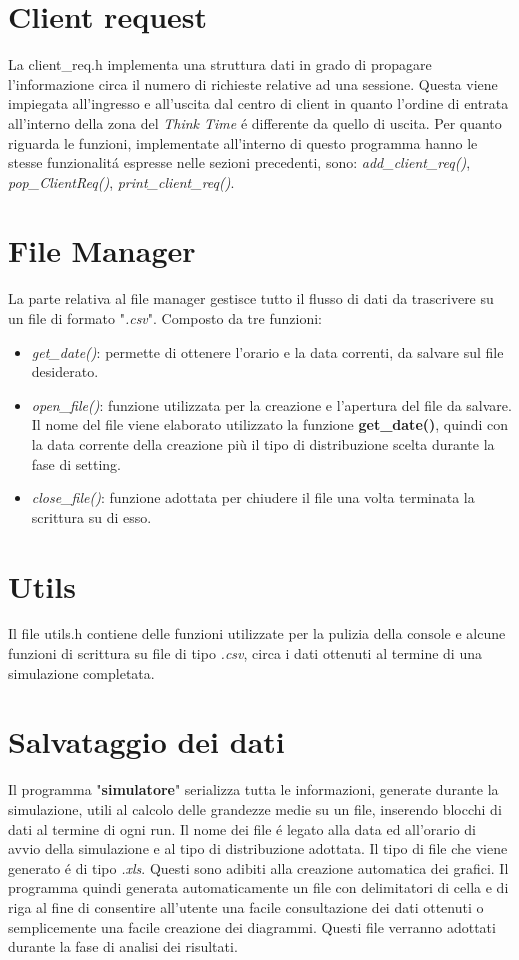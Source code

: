 \section{Client request}
La client\_req.h implementa una struttura dati in grado di propagare l'informazione circa il numero di richieste relative ad una sessione. Questa viene impiegata all'ingresso e all'uscita dal centro di client in quanto l'ordine di entrata all'interno della zona del \textit{Think Time} \'e differente da quello di uscita.
Per quanto riguarda le funzioni, implementate all'interno di questo programma hanno le stesse funzionalit\'a espresse nelle sezioni precedenti, sono: \textit{add\_client\_req()}, \textit{pop\_ClientReq()}, \textit{print\_client\_req()}.

\section{File Manager}
La parte relativa al file manager gestisce tutto il flusso di dati da trascrivere  su un file di formato "\textit{.csv}". Composto da tre funzioni:
\begin{itemize}
\item \textit{get\_date()}: permette di ottenere l'orario e la data correnti, da salvare sul file desiderato.
\item \textit{open\_file()}: funzione utilizzata per la creazione e l'apertura del file da salvare. Il nome del file viene elaborato utilizzato la funzione \textbf{get\_date()}, quindi con la data corrente della creazione più il tipo di distribuzione scelta durante la fase di setting.
\item \textit{close\_file()}: funzione adottata per chiudere il file una volta terminata la scrittura su di esso.
\end{itemize}

\section{Utils}
Il file utils.h contiene delle funzioni utilizzate per la pulizia della console e alcune funzioni di scrittura su file di tipo \textit{.csv}, circa i dati ottenuti al termine di una simulazione completata.

\section{Salvataggio dei dati}
Il programma "\textbf{simulatore}" serializza tutta le informazioni, generate durante la simulazione, utili al calcolo delle grandezze medie su un file, inserendo blocchi di dati al termine di ogni run.
Il nome dei file \'e legato alla data ed all'orario di avvio della simulazione e al tipo di distribuzione adottata.
Il tipo di file che viene generato \'e di tipo \textit{.xls}. Questi sono adibiti alla creazione automatica dei grafici. Il programma quindi generata automaticamente un file con delimitatori di cella e di riga al fine di consentire all'utente una facile consultazione dei dati ottenuti o semplicemente una facile creazione dei diagrammi. Questi file verranno adottati durante la fase di analisi dei risultati.

